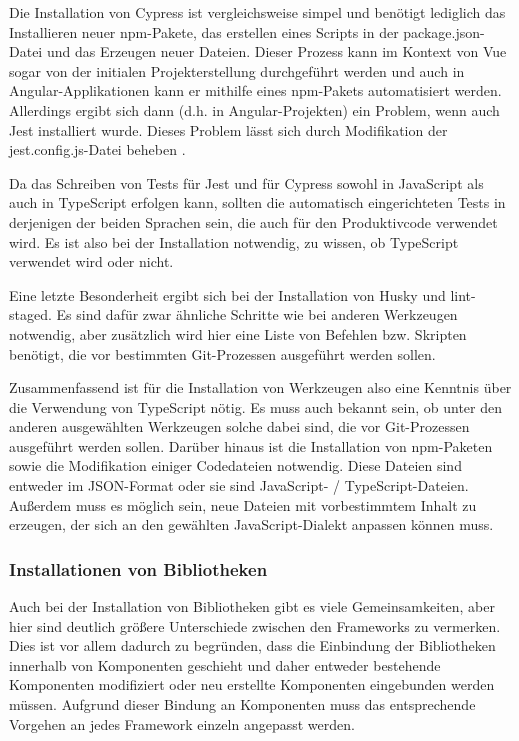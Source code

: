 Die Installation von Cypress ist vergleichsweise simpel und benötigt lediglich das Installieren neuer \gls{npm}-Pakete, das erstellen eines Scripts in der package.json-Datei und das Erzeugen neuer Dateien. Dieser Prozess kann im Kontext von Vue sogar von der initialen Projekterstellung durchgeführt werden und auch in Angular-Applikationen kann er mithilfe eines \gls{npm}-Pakets automatisiert werden. Allerdings ergibt sich dann (d.h. in Angular-Projekten) ein Problem, wenn auch Jest installiert wurde. Dieses Problem lässt sich durch Modifikation der jest.config.js-Datei beheben \cite{angular_jest_cypress_issue}.

Da das Schreiben von Tests für Jest und für Cypress sowohl in JavaScript als auch in TypeScript erfolgen kann, sollten die automatisch eingerichteten Tests in derjenigen der beiden Sprachen sein, die auch für den Produktivcode verwendet wird. Es ist also bei der Installation notwendig, zu wissen, ob TypeScript verwendet wird oder nicht.

Eine letzte Besonderheit ergibt sich bei der Installation von Husky und lint-staged. Es sind dafür zwar ähnliche Schritte wie bei anderen Werkzeugen notwendig, aber zusätzlich wird hier eine Liste von Befehlen bzw. Skripten benötigt, die vor bestimmten Git-Prozessen ausgeführt werden sollen.

Zusammenfassend ist für die Installation von Werkzeugen also eine Kenntnis über die Verwendung von TypeScript nötig. Es muss auch bekannt sein, ob unter den anderen ausgewählten Werkzeugen solche dabei sind, die vor Git-Prozessen ausgeführt werden sollen. Darüber hinaus ist die Installation von \gls{npm}-Paketen sowie die Modifikation einiger Codedateien notwendig. Diese Dateien sind entweder im \gls{JSON}-Format oder sie sind JavaScript- / TypeScript-Dateien. Außerdem muss es möglich sein, neue Dateien mit vorbestimmtem Inhalt zu erzeugen, der sich an den gewählten JavaScript-Dialekt anpassen können muss.

\subsubsection{Installationen von Bibliotheken}
Auch bei der Installation von Bibliotheken gibt es viele Gemeinsamkeiten, aber hier sind deutlich größere Unterschiede zwischen den Frameworks zu vermerken. Dies ist vor allem dadurch zu begründen, dass die Einbindung der Bibliotheken innerhalb von Komponenten geschieht und daher entweder bestehende Komponenten modifiziert oder neu erstellte Komponenten eingebunden werden müssen. Aufgrund dieser Bindung an Komponenten muss das entsprechende Vorgehen an jedes Framework einzeln angepasst werden.

